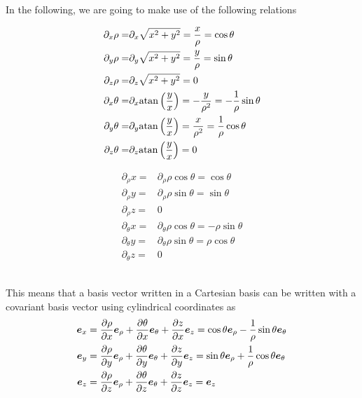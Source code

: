 In the following, we are going to make use of the following relations
\\
%
\begin{minipage}{0.4\textwidth}
\begin{align*}
    \partial_x \rho
    =&
    \partial_x \sqrt{x^2+y^2}
    =
    \frac{x}{\rho}
    =
    \cos\theta\\
    \partial_y \rho
    =&
    \partial_y \sqrt{x^2+y^2}
    =
    \frac{y}{\rho}
    =
    \sin\theta
    \\
    \partial_z \rho
    =&
    \partial_z \sqrt{x^2+y^2}
    =
    0
    \\
    \partial_x \theta
    =&
    \partial_x \text{atan}\left(\frac{y}{x}\right)
    =
    -\frac{y}{\rho^2}
    =
    -\frac{1}{\rho}\sin\theta
    \\
    \partial_y \theta
    =&
    \partial_y \text{atan}\left(\frac{y}{x}\right)
    =
    \frac{x}{\rho^2}
    =
    \frac{1}{\rho}\cos\theta
    \\
    \partial_z \theta
    =&
    \partial_z \text{atan}\left(\frac{y}{x}\right)
    =
    0
    \\
\end{align*}
\end{minipage}
%
\hfill
%
\begin{minipage}{0.4\textwidth}
\begin{align*}
    \partial_\rho x
    =&
    \partial_\rho \rho\cos\theta
    =
    \cos\theta\\
    \partial_\rho y
    =&
    \partial_\rho \rho\sin\theta
    =
    \sin\theta
    \\
    \partial_\rho z
    =&
    0
    \\
    \partial_\theta x
    =&
    \partial_\theta \rho\cos\theta
    =
    -\rho\sin\theta
    \\
    \partial_\theta y
    =&
    \partial_\theta \rho\sin\theta
    =
    \rho\cos\theta
    \\
    \partial_\theta z
    =&
    0
\end{align*}
\end{minipage}\\
%
This means that a basis vector written in a Cartesian basis can be written with a covariant basis vector using cylindrical coordinates as
%
\begin{align*}
    \ve{e}_x
    &=
    \parti{\rho}{x} \ve{e}_{\rho}
    + \parti{\theta}{x} \ve{e}_{\theta}
    + \parti{z}{x} \ve{e}_{z}
    =
    \cos\theta \ve{e}_\rho
    - \frac{1}{\rho} \sin\theta \ve{e}_\theta
    \\
%
%
    \ve{e}_y
    &=
    \parti{\rho}{y} \ve{e}_{\rho}
    + \parti{\theta}{y} \ve{e}_{\theta}
    + \parti{z}{y} \ve{e}_{z}
    =
    \sin\theta \ve{e}_\rho
    + \frac{1}{\rho} \cos\theta \ve{e}_\theta
    \\
%
%
    \ve{e}_z
    &=
    \parti{\rho}{z} \ve{e}_{\rho}
    + \parti{\theta}{z} \ve{e}_{\theta}
    + \parti{z}{z} \ve{e}_{z}
    =
    \ve{e}_z
\end{align*}
